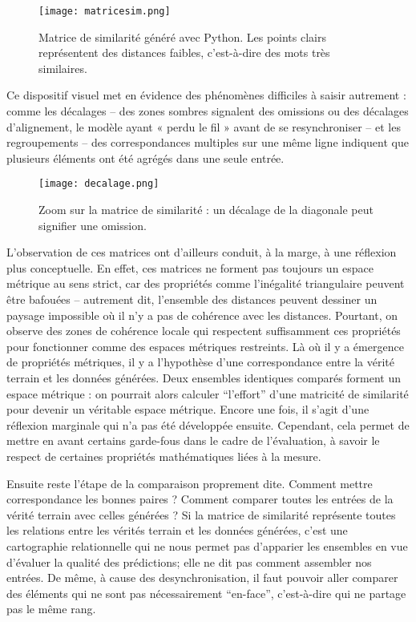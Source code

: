\begin{figure}[htbp]
\centering
\texttt{[image: matricesim.png]}
\caption{Matrice de similarité généré avec Python. Les points clairs représentent des distances faibles, c'est-à-dire des mots très similaires.}
\label{fig:matricesim}
\end{figure}

Ce dispositif visuel met en évidence des phénomènes difficiles à saisir autrement : comme les décalages -- des zones sombres signalent des omissions ou des décalages d’alignement, le modèle ayant « perdu le fil » avant de se resynchroniser -- et les regroupements -- des correspondances multiples sur une même ligne indiquent que plusieurs éléments ont été agrégés dans une seule entrée.

\begin{figure}[htbp]
\centering
\texttt{[image: decalage.png]}
\caption{Zoom sur la matrice de similarité : un décalage de la diagonale peut signifier une omission.}
\label{fig:decalage}
\end{figure}

L’observation de ces matrices ont d'ailleurs conduit, à la marge, à une réflexion plus conceptuelle. En effet, ces matrices ne forment pas toujours un espace métrique au sens strict, car des propriétés comme l’inégalité triangulaire peuvent être bafouées -- autrement dit, l'ensemble des distances peuvent dessiner un paysage impossible où il n'y a pas de cohérence avec les distances. Pourtant, on observe des zones de cohérence locale qui respectent suffisamment ces propriétés pour fonctionner comme des espaces métriques restreints. Là où il y a émergence de propriétés métriques, il y a l'hypothèse d'une correspondance entre la vérité terrain et les données générées. Deux ensembles identiques comparés forment un espace métrique : on pourrait alors calculer \enquote{l'effort} d'une matricité de similarité pour devenir un véritable espace métrique. Encore une fois, il s'agit d'une réflexion marginale qui n'a pas été développée ensuite. Cependant, cela permet de mettre en avant certains garde-fous dans le cadre de l'évaluation, à savoir le respect de certaines propriétés mathématiques liées à la mesure.

Ensuite reste l'étape de la comparaison proprement dite. Comment mettre correspondance les bonnes paires ? Comment comparer toutes les entrées de la vérité terrain avec celles générées ? Si la matrice de similarité représente toutes les relations entre les vérités terrain et les données générées, c'est une cartographie relationnelle qui ne nous permet pas d'apparier les ensembles en vue d'évaluer la qualité des prédictions; elle ne dit pas comment assembler nos entrées. De même, à cause des desynchronisation, il faut pouvoir aller comparer des éléments qui ne sont pas nécessairement \enquote{en-face}, c'est-à-dire qui ne partage pas le même rang.


